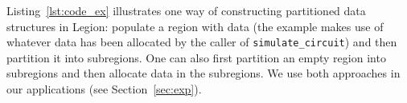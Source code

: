 

Listing~\ref{lst:code_ex} illustrates one way of constructing partitioned
data structures in Legion: populate a region with data (the example
makes use of whatever data has been allocated by the caller of {\tt simulate\_circuit})
and then partition it into subregions.  One can also first partition an empty region into subregions
and then allocate data in the subregions. We use both approaches in our
applications (see Section~\ref{sec:exp}).






